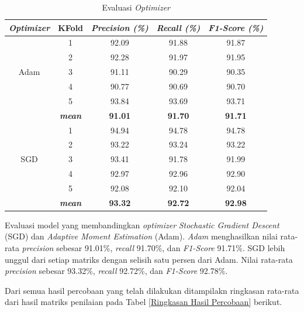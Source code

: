 \begin{table}[H]
        \begin{table}[H]
        \centering
        \caption{Evaluasi \textit{Optimizer}}
        \begin{tabular}{ccccc}
            \toprule
            \textbf{\textit{Optimizer}} & \multicolumn{1}{c}{\textbf{KFold}} & \textbf{\textit{Precision (\%) } } & \textbf{\textit{Recall (\%)}} & \textbf{\textit{F1-Score (\%)}}\\
        
            \midrule
            \multirow{5}{*}{Adam} 
            & 1 & 92.09 & 91.88 & 91.87 \\
            & 2 & 92.28 & 91.97 & 91.95 \\
            & 3 & 91.11 & 90.29 & 90.35 \\
            & 4 & 90.77 & 90.69 & 90.70 \\
            & 5 & 93.84 & 93.69 & 93.71 \\ 
            & \textit{\textbf{mean}}& \textbf{91.01} & \textbf{91.70} &\textbf{91.71} \\ 
            \hline

    
            \multirow{5}{*}{SGD}
            & 1 & 94.94 & 94.78 & 94.78 \\
            & 2 & 93.22 & 93.24 & 93.22 \\
            & 3 & 93.41 & 91.78 & 91.99 \\
            & 4 & 92.97 & 92.96 & 92.90 \\
            & 5 & 92.08 & 92.10 & 92.04  \\
            & \textit{\textbf{mean}}& \textbf{93.32} & \textbf{92.72} &\textbf{92.98} \\ 
    

            \bottomrule
        \end{tabular}
        \label{Evaluasi Optimizer}
    \end{table}

    Evaluasi model yang membandingkan \textit{optimizer} \textit{Stochastic Gradient Descent} (SGD) dan \textit{Adaptive Moment Estimation} (Adam).  \textit{Adam} menghasilkan nilai rata-rata \textit{precision} sebesar 91.01\%, \textit{recall} 91.70\%, dan\textit{ F1-Score} 91.71\%. SGD lebih unggul dari setiap matriks dengan selisih satu persen dari Adam. Nilai rata-rata \textit{precision} sebesar 93.32\%, \textit{recall} 92.72\%, dan\textit{ F1-Score} 92.78\%.

    


    Dari semua hasil percobaan yang telah dilakukan ditampilakn ringkasan rata-rata dari hasil matriks penilaian pada Tabel \ref{Ringkasan Hasil Percobaan} berikut.



\end{table}
